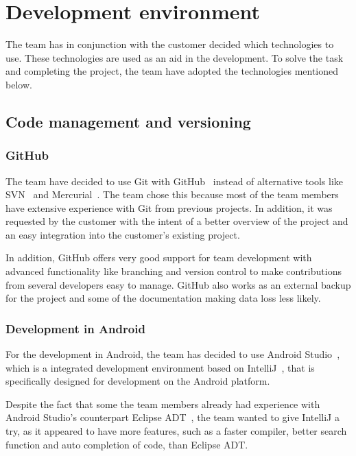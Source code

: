 \chapter{Development environment}

The team has in conjunction with the customer decided which technologies to use. These technologies are used as an aid in the development. To solve the task and completing the project, the team have adopted the technologies mentioned below.


\section{Code management and versioning}
\subsection{GitHub}
The team have decided to use Git with GitHub~\cite{github} instead of alternative tools like SVN~\cite{svn} and Mercurial~\cite{mercurial}. 
The team chose this because most of the team members have extensive experience with Git from previous projects. In addition, it was requested by the customer with the intent of a better overview of the project and an easy integration into the customer's existing project.  

In addition, GitHub offers very good support for team development 
with advanced functionality like branching and version control to make contributions from several developers easy 
to manage. GitHub also works as an external backup for the project and some of the documentation making data loss less likely.

\subsection{Development in Android}
For the development in Android, the team has decided to use Android Studio~\cite{android-studio}, which is a integrated development environment based on IntelliJ~\cite{intellij}, that is specifically designed for development on the Android platform.

Despite the fact that some the team members already had experience with Android Studio's counterpart Eclipse ADT~\cite{eclipse}, the team wanted to give IntelliJ a try, as it appeared to have more features, such as a faster compiler, better search function and auto completion of code, than Eclipse ADT. 

